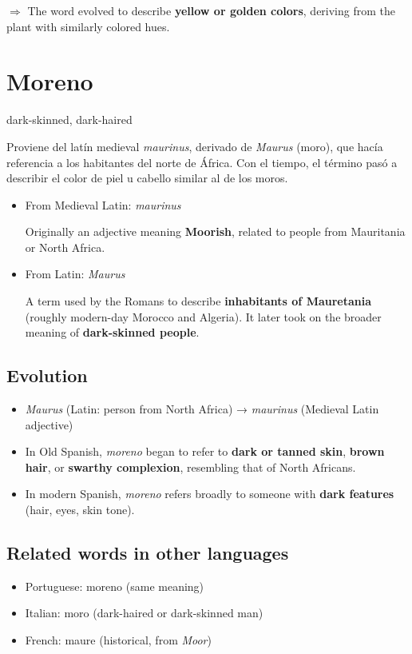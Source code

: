 \documentclass[10pt]{book}
\newcommand{\wordentry}[2]{
	\large #1
	\vspace{-0.5em}
	\begin{etymologybox}
		#2
	\end{etymologybox}
}
\let\oldsection\section
\renewcommand{\section}[1]{
	\needspace{8\baselineskip}
	\oldsection{#1}
}
\begin{document}
	$\Rightarrow$ The word evolved to describe \textbf{yellow or golden colors}, deriving from the plant with similarly colored hues.
	
	\section{Moreno}
	\wordentry{dark-skinned, dark-haired}{
		Proviene del latín medieval \textit{maurinus}, derivado de \textit{Maurus} (moro), que hacía referencia a los habitantes del norte de África. Con el tiempo, el término pasó a describir el color de piel u cabello similar al de los moros.
		\begin{itemize}
			\item From Medieval Latin: \textit{maurinus}
			
			Originally an adjective meaning \textbf{Moorish}, related to people from Mauritania or North Africa.
			
			\item From Latin: \textit{Maurus}
			
			A term used by the Romans to describe \textbf{inhabitants of Mauretania} (roughly modern-day Morocco and Algeria). It later took on the broader meaning of \textbf{dark-skinned people}.
		\end{itemize}
	}
	
	\subsection*{Evolution}
	\begin{itemize}
		\item \textit{Maurus} (Latin: person from North Africa) → \textit{maurinus} (Medieval Latin adjective)
		\item In Old Spanish, \textit{moreno} began to refer to \textbf{dark or tanned skin}, \textbf{brown hair}, or \textbf{swarthy complexion}, resembling that of North Africans.
		\item In modern Spanish, \textit{moreno} refers broadly to someone with \textbf{dark features} (hair, eyes, skin tone).
	\end{itemize}
	
	\subsection*{Related words in other languages}
	\begin{itemize}
		\item Portuguese: moreno (same meaning)
		\item Italian: moro (dark-haired or dark-skinned man)
		\item French: maure (historical, from \textit{Moor})
	\end{itemize}
	
\end{document}
